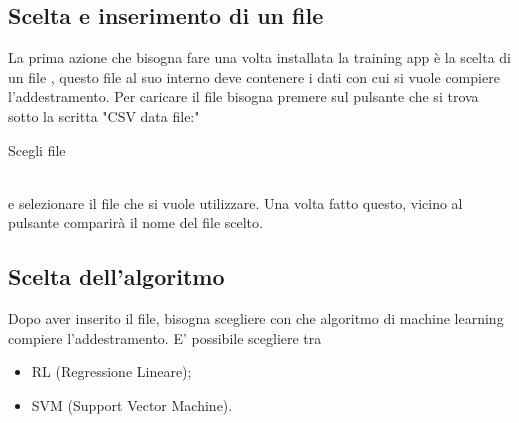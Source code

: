 \documentclass[../manuale-utente.tex]{subfiles}
\begin{document}
\subsection{Scelta e inserimento di un file}
\label{subs:scelta-e-inserimento}
La prima azione che bisogna fare una volta installata la training app è la scelta di un file , questo file al suo interno deve contenere i dati con cui si vuole compiere l'addestramento. Per caricare il file bisogna premere sul pulsante che si trova sotto la scritta "CSV data file:"\\
\centerline{Scegli file}\\
e selezionare il file che si vuole utilizzare. Una volta fatto questo, vicino al pulsante comparirà il nome del file scelto.



\subsection{Scelta dell'algoritmo}
\label{subs:scelta-algoritmo}
Dopo aver inserito il file, bisogna scegliere con che algoritmo di machine learning compiere l'addestramento. E' possibile scegliere tra
\begin{itemize}
  \item RL (Regressione Lineare);
  \item SVM (Support Vector Machine).
\end{itemize}
\end{document}
